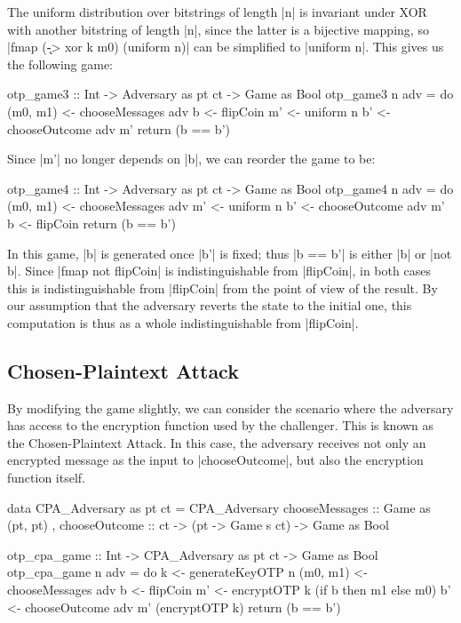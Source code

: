 The uniform distribution over bitstrings of length |n| is invariant under XOR with another bitstring of length |n|,
since the latter is a bijective mapping, so |fmap (\k -> xor k m0) (uniform n)| can be simplified to |uniform n|.  This
gives us the following game:
\begin{code}
otp_game3 :: Int -> Adversary as pt ct -> Game as Bool
otp_game3 n adv = do
    (m0, m1) <- chooseMessages adv
    b <- flipCoin
    m' <- uniform n
    b' <- chooseOutcome adv m'
    return (b == b')
\end{code}

Since |m'| no longer depends on |b|, we can reorder the game to be:
\begin{code}
otp_game4 :: Int -> Adversary as pt ct -> Game as Bool
otp_game4 n adv = do
    (m0, m1) <- chooseMessages adv
    m' <- uniform n
    b' <- chooseOutcome adv m'
    b <- flipCoin
    return (b == b')
\end{code}

In this game, |b| is generated once |b'| is fixed; thus |b == b'| is either |b| or |not b|.  Since |fmap not flipCoin|
is indistinguishable from |flipCoin|, in both cases this is indistinguishable from |flipCoin| from the point of view of
the result.  By our assumption that the adversary reverts the state to the initial one, this computation is thus as a
whole indistinguishable from |flipCoin|.

\subsection{Chosen-Plaintext Attack}

By modifying the game slightly, we can consider the scenario where the adversary has access to the encryption function
used by the challenger.  This is known as the Chosen-Plaintext Attack.  In this case, the adversary receives not only an
encrypted message as the input to |chooseOutcome|, but also the encryption function itself.
\begin{code}
data CPA_Adversary as pt ct = CPA_Adversary
                            { chooseMessages :: Game as (pt, pt)
                            , chooseOutcome :: ct
                                            -> (pt -> Game s ct)
                                            -> Game as Bool
                            }

otp_cpa_game :: Int -> CPA_Adversary as pt ct -> Game as Bool
otp_cpa_game n adv = do
    k <- generateKeyOTP n
    (m0, m1) <- chooseMessages adv
    b <- flipCoin
    m' <- encryptOTP k (if b then m1 else m0)
    b' <- chooseOutcome adv m' (encryptOTP k)
    return (b == b')
\end{code}

